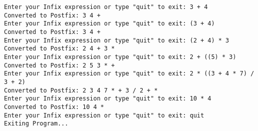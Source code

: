 \begin{verbatim}
Enter your Infix expression or type "quit" to exit: 3 + 4
Converted to Postfix: 3 4 + 
Enter your Infix expression or type "quit" to exit: (3 + 4)
Converted to Postfix: 3 4 + 
Enter your Infix expression or type "quit" to exit: (2 + 4) * 3
Converted to Postfix: 2 4 + 3 * 
Enter your Infix expression or type "quit" to exit: 2 + ((5) * 3)
Converted to Postfix: 2 5 3 * + 
Enter your Infix expression or type "quit" to exit: 2 * ((3 + 4 * 7) / 3 + 2)
Converted to Postfix: 2 3 4 7 * + 3 / 2 + * 
Enter your Infix expression or type "quit" to exit: 10 * 4
Converted to Postfix: 10 4 * 
Enter your Infix expression or type "quit" to exit: quit
Exiting Program...
\end{verbatim}